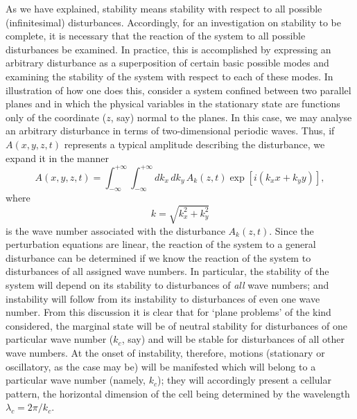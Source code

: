 As we have explained, stability means stability with respect to all
possible (infinitesimal) disturbances.  Accordingly, for an investigation
on stability to be complete, it is necessary that the reaction of the system
to all possible disturbances be examined.  In practice, this is accomplished
by expressing an arbitrary disturbance as a superposition of certain
basic possible modes and examining the stability of the system with
respect to each of these modes.  In illustration of how one does this,
consider a system confined between two parallel planes and in which
the physical variables in the stationary state are functions only of the
coordinate ($z$, say) normal to the planes.  In this case, we may analyse
an arbitrary disturbance in terms of two-dimensional periodic waves.
Thus, if $A(x, y, z, t)$ represents a typical amplitude describing the
disturbance, we expand it in the manner
\begin{equation}
\label{eq:1-2}
A(x, y, z, t) = \int_{-\infty}^{+\infty} \int_{-\infty}^{+\infty}
dk_x\, dk_y\, A_k(z, t) \exp[i(k_x x + k_y y)],
\end{equation}
where
\begin{equation}
\label{eq:1-3}
k = \sqrt{k_x^2 + k_y^2}
\end{equation}
is the wave number associated with the disturbance $A_k(z, t)$.  Since the
perturbation equations are linear, the reaction of the system to a general
disturbance can be determined if we know the reaction of the system to
disturbances of all assigned wave numbers.  In particular, the stability
of the system will depend on its stability to disturbances of \emph{all} wave
numbers; and instability will follow from its instability to disturbances
of even one wave number.  From this discussion it is clear that for `plane
problems' of the kind considered, the marginal state will be of neutral
stability for disturbances of one particular wave number ($k_c$, say) and
will be stable for disturbances of all other wave numbers.  At the onset
of instability, therefore, motions (stationary or oscillatory, as the case
may be) will be manifested which will belong to a particular wave
number (namely, $k_c$); they will accordingly present a cellular pattern,
the horizontal dimension of the cell being determined by the wavelength
$\lambda_c = 2\pi/k_c$.

